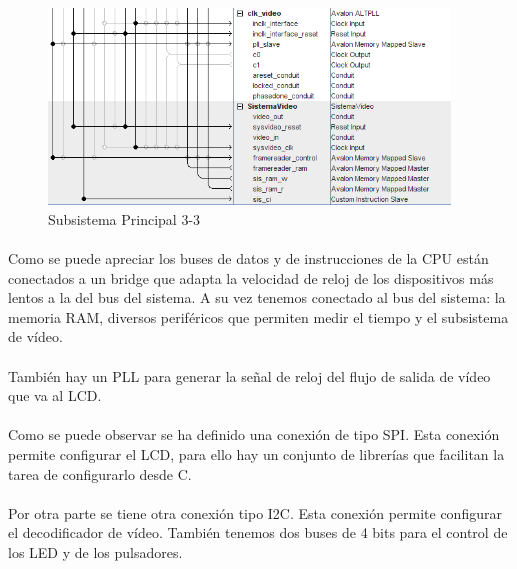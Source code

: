 \documentclass[a4paper,12pt,titlepage,final]{book}
\begin{document}
\begin{figure}[p]
\centering
\includegraphics[height=0.5\textheight,
width=0.95\textwidth]{./figuras/SistemaPrincipal/sistemaprincipalpagina3.png}
\caption{Subsistema Principal 3-3}
\label{fig:Subsistema Principal 3-3}
\end{figure}

\paragraph{}
Como se puede apreciar los buses de datos y de instrucciones de la CPU están conectados a un bridge que adapta la velocidad de reloj de los dispositivos más lentos a la del bus del sistema. A su vez tenemos conectado al bus del sistema: la memoria RAM, diversos periféricos que permiten medir el tiempo y el subsistema de vídeo.

\paragraph{}
También hay un PLL para generar la señal de reloj del flujo de salida de vídeo que va al LCD.

\paragraph{}
Como se puede observar se ha definido una conexión de tipo SPI. Esta conexión permite configurar el LCD, para ello hay un conjunto de librerías que facilitan la tarea de configurarlo desde C. 

\paragraph{}
Por otra parte se tiene otra conexión tipo I2C. Esta conexión permite configurar el  decodificador de vídeo. También tenemos dos buses de 4 bits para el control de los LED y de los pulsadores.
\end{document}
